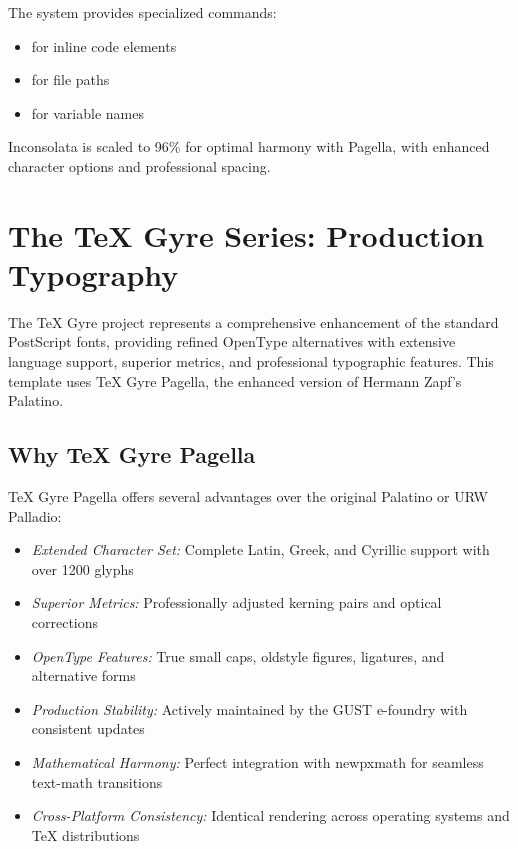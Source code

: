 \documentclass[11pt]{article}
\begin{document}
 The system provides specialized commands:
\begin{itemize}
\item {} for inline code elements
\item {} for file paths  
\item {} for variable names
\end{itemize}

Inconsolata is scaled to 96\% for optimal harmony with Pagella, with enhanced character options and professional spacing.

\section{The TeX Gyre Series: Production Typography}

The TeX Gyre project represents a comprehensive enhancement of the standard PostScript fonts, providing refined OpenType alternatives with extensive language support, superior metrics, and professional typographic features. This template uses TeX Gyre Pagella, the enhanced version of Hermann Zapf's Palatino.

\subsection{Why TeX Gyre Pagella}

TeX Gyre Pagella offers several advantages over the original Palatino or URW Palladio:

\begin{itemize}
\item \emph{Extended Character Set:} Complete Latin, Greek, and Cyrillic support with over 1200 glyphs
\item \emph{Superior Metrics:} Professionally adjusted kerning pairs and optical corrections
\item \emph{OpenType Features:} True small caps, oldstyle figures, ligatures, and alternative forms
\item \emph{Production Stability:} Actively maintained by the GUST e-foundry with consistent updates
\item \emph{Mathematical Harmony:} Perfect integration with newpxmath for seamless text-math transitions
\item \emph{Cross-Platform Consistency:} Identical rendering across operating systems and TeX distributions
\end{itemize}
\end{document}

